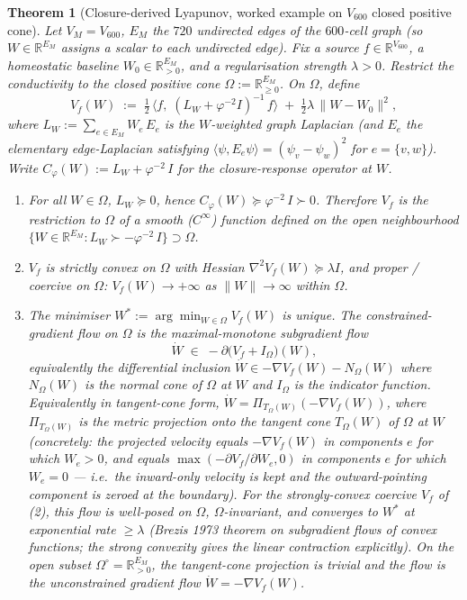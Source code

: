 \documentclass[11pt]{article}
\newtheorem{theorem}{Theorem}[section]
\theoremstyle{definition}
\newcommand{\R}{\mathbb{R}}
\begin{document}
\begin{theorem}[Closure-derived Lyapunov, worked example on $V_{600}$ closed positive cone]\label{thm:lyapunov-closure}
Let $V_M = V_{600}$, $E_M$ the $720$ undirected edges of the $600$-cell graph (so $W \in \R^{E_M}$ assigns a scalar to each undirected edge). Fix a source $f \in \R^{V_{600}}$, a homeostatic baseline $W_0 \in \R^{E_M}_{>0}$, and a regularisation strength $\lambda > 0$. Restrict the conductivity to the closed positive cone $\Omega := \R^{E_M}_{\geq 0}$. On $\Omega$, define
\[
   V_f(W) \;:=\; \tfrac{1}{2}\,\bigl\langle f,\; (L_W + \varphi^{-2} I)^{-1}\,f\bigr\rangle \;+\; \tfrac{1}{2}\lambda\,\|W - W_0\|^2,
\]
where $L_W := \sum_{e\in E_M} W_e\,E_e$ is the $W$-weighted graph Laplacian (and $E_e$ the elementary edge-Laplacian satisfying $\langle\psi, E_e\psi\rangle = (\psi_v - \psi_w)^2$ for $e = \{v,w\}$). Write $C_\varphi(W) := L_W + \varphi^{-2}\, I$ for the closure-response operator at $W$.
\begin{enumerate}
\item For all $W \in \Omega$, $L_W \succeq 0$, hence $C_\varphi(W) \succeq \varphi^{-2}\, I \succ 0$. Therefore $V_f$ is the restriction to $\Omega$ of a smooth ($C^\infty$) function defined on the open neighbourhood $\{W \in \R^{E_M} : L_W \succ -\varphi^{-2}\, I\} \supset \Omega$.
\item $V_f$ is strictly convex on $\Omega$ with Hessian $\nabla^2 V_f(W) \succeq \lambda I$, and proper / coercive on $\Omega$: $V_f(W) \to +\infty$ as $\|W\| \to \infty$ within $\Omega$.
\item The minimiser $W^* := \arg\min_{W \in \Omega} V_f(W)$ is unique. The constrained-gradient flow on $\Omega$ is the maximal-monotone subgradient flow~\citep{Brezis1973}
\[
   \dot W \;\in\; -\partial\bigl(V_f + I_\Omega\bigr)(W),
\]
equivalently the differential inclusion $\dot W \in -\nabla V_f(W) - N_\Omega(W)$ where $N_\Omega(W)$ is the normal cone of $\Omega$ at $W$ and $I_\Omega$ is the indicator function. Equivalently in tangent-cone form, $\dot W = \Pi_{T_\Omega(W)}(-\nabla V_f(W))$, where $\Pi_{T_\Omega(W)}$ is the metric projection onto the tangent cone $T_\Omega(W)$ of $\Omega$ at $W$ (concretely: the projected velocity equals $-\nabla V_f(W)$ in components $e$ for which $W_e > 0$, and equals $\max(-\partial V_f/\partial W_e, 0)$ in components $e$ for which $W_e = 0$ — i.e.\ the inward-only velocity is kept and the outward-pointing component is zeroed at the boundary). For the strongly-convex coercive $V_f$ of (2), this flow is well-posed on $\Omega$, $\Omega$-invariant, and converges to $W^*$ at exponential rate $\geq \lambda$ (Brezis 1973 theorem on subgradient flows of convex functions; the strong convexity gives the linear contraction explicitly). On the open subset $\Omega^\circ = \R^{E_M}_{>0}$, the tangent-cone projection is trivial and the flow is the unconstrained gradient flow $\dot W = -\nabla V_f(W)$.

\end{enumerate}
\end{theorem}
\end{document}
